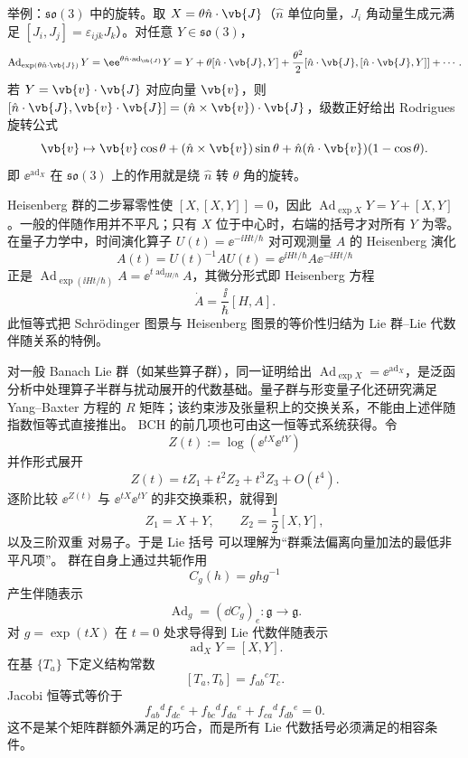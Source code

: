 举例：$\mathfrak{so}(3)$ 中的旋转。取 $X=\theta\hat n\cdot\vb{J}$（$\hat n$ 单位向量，$J_i$ 角动量生成元满足 $[J_i,J_j]=\varepsilon_{ijk}J_k$）。对任意 $Y\in\mathfrak{so}(3)$，
\[
\operatorname{Ad}_{\exp(\theta\hat n\cdot\vb{J})}Y
=\ee^{\theta\hat n\cdot\operatorname{ad}_{\vb{J}}}Y
=Y+\theta[\hat n\cdot\vb{J},Y]+\frac{\theta^2}{2}[\hat n\cdot\vb{J},[\hat n\cdot\vb{J},Y]]+\cdots.
\]
若 $Y=\vb{v}\cdot\vb{J}$ 对应向量 $\vb{v}$，则 $[\hat n\cdot\vb{J},\vb{v}\cdot\vb{J}]=(\hat n\times\vb{v})\cdot\vb{J}$，级数正好给出 Rodrigues 旋转公式
\[
\vb{v}\mapsto \vb{v}\cos\theta+(\hat n\times\vb{v})\sin\theta+\hat n(\hat n\cdot\vb{v})(1-\cos\theta).
\]
即 $\ee^{\operatorname{ad}_X}$ 在 $\mathfrak{so}(3)$ 上的作用就是绕 $\hat n$ 转 $\theta$ 角的旋转。

Heisenberg 群的二步幂零性使 $[X,[X,Y]]=0$，因此 $\operatorname{Ad}_{\exp X}Y=Y+[X,Y]$。一般的伴随作用并不平凡；只有 $X$ 位于中心时，右端的括号才对所有 $Y$ 为零。在量子力学中，时间演化算子 $U(t)=\ee^{-\ii Ht/\hbar}$ 对可观测量 $A$ 的 Heisenberg 演化
\[
A(t)=U(t)^{-1}AU(t)=\ee^{\ii Ht/\hbar}A\ee^{-\ii Ht/\hbar}
\]
正是 $\operatorname{Ad}_{\exp(\ii Ht/\hbar)}A=\ee^{t\operatorname{ad}_{\ii H/\hbar}}A$，其微分形式即 Heisenberg 方程
\[
\dot A=\frac{\ii}{\hbar}[H,A].
\]
此恒等式把 Schrödinger 图景与 Heisenberg 图景的等价性归结为 Lie 群--Lie 代数伴随关系的特例。

对一般 Banach Lie 群（如某些算子群），同一证明给出 $\operatorname{Ad}_{\exp X}=\ee^{\operatorname{ad}_X}$，是泛函分析中处理算子半群与扰动展开的代数基础。量子群与形变量子化还研究满足 Yang--Baxter 方程的 $R$ 矩阵；该约束涉及张量积上的交换关系，不能由上述伴随指数恒等式直接推出。
BCH 的前几项也可由这一恒等式系统获得。令
\[
Z(t):=\log(\ee^{tX}\ee^{tY})
\]
并作形式展开
\[
Z(t)=tZ_1+t^2Z_2+t^3Z_3+O(t^4).
\]
逐阶比较 $\ee^{Z(t)}$ 与 $\ee^{tX}\ee^{tY}$ 的非交换乘积，就得到
\[
Z_1=X+Y,
\qquad
Z_2=\frac12[X,Y],
\]
以及三阶双重 对易子。于是 Lie 括号 可以理解为“群乘法偏离向量加法的最低非平凡项”。
群在自身上通过共轭作用
\[
C_g(h)=ghg^{-1}
\]
产生伴随表示
\[
\operatorname{Ad}_g
=(\dd C_g)_e:\mathfrak g\to\mathfrak g.
\]
对 $g=\exp(tX)$ 在 $t=0$ 处求导得到 Lie 代数伴随表示
\[
\operatorname{ad}_X Y=[X,Y].
\]
在基 $\{T_a\}$ 下定义结构常数
\[
[T_a,T_b]=f_{ab}{}^cT_c.
\]
Jacobi 恒等式等价于
\begin{equation*}f_{ab}{}^d f_{dc}{}^e
+f_{bc}{}^d f_{da}{}^e
+f_{ca}{}^d f_{db}{}^e=0.\end{equation*}
这不是某个矩阵群额外满足的巧合，而是所有 Lie 代数括号必须满足的相容条件。

